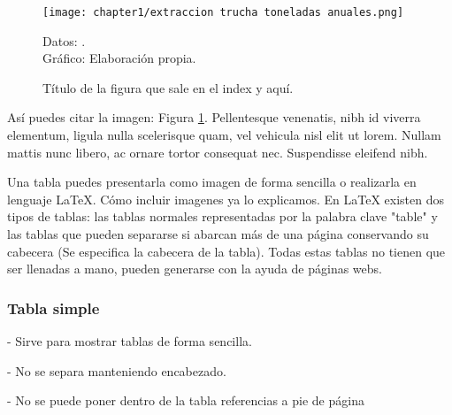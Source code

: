 \begin{figure}[H]
	\centering
	\texttt{[image: chapter1/extraccion trucha toneladas anuales.png]}
	\vspace{-1em}
	\caption{Título de la figura que sale en el index y aquí.}	
	\vspace{-1.5em}
	\begin{flushleft}
		\small Datos: \cite{baker2011}. \\
			Gráfico: Elaboración propia.
	\end{flushleft}
	\label{figura:nombre llave para referenciar la imagen en el texto}
\end{figure}
Así puedes citar la imagen: Figura \ref{figura:nombre llave para referenciar la imagen en el texto}.  Pellentesque venenatis, nibh id viverra elementum, ligula nulla scelerisque quam, vel vehicula nisl elit ut lorem. Nullam mattis nunc libero, ac ornare tortor consequat nec. Suspendisse eleifend nibh. \cite{Hardy2009}

Una tabla puedes presentarla como imagen de forma sencilla o realizarla en lenguaje LaTeX. Cómo incluir imagenes ya lo explicamos. En LaTeX existen dos tipos de tablas: las tablas normales representadas por la palabra clave "table" y las tablas que pueden separarse si abarcan más de una página conservando su cabecera (Se especifica la cabecera de la tabla). Todas estas tablas no tienen que ser llenadas a mano, pueden generarse con la ayuda de páginas webs.

\subsubsection{Tabla simple}

- Sirve para mostrar tablas de forma sencilla.

- No se separa manteniendo encabezado.

- No se puede poner dentro de la tabla referencias a pie de página



